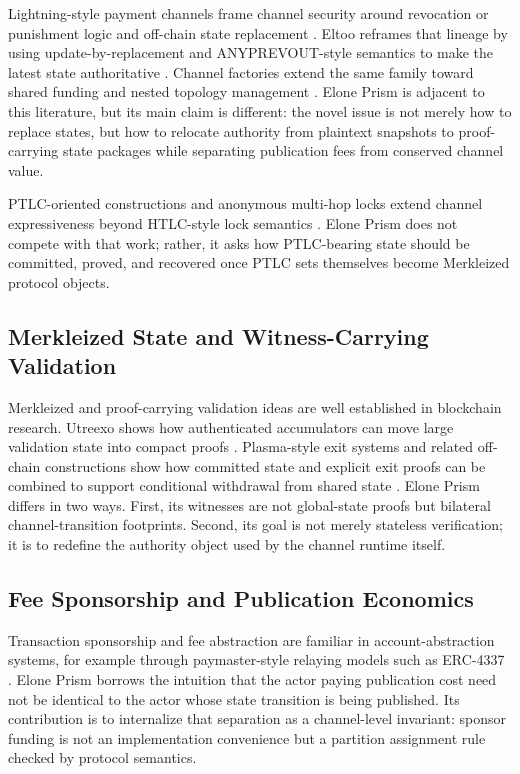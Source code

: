 \documentclass[11pt,a4paper]{article}
\newcommand{\rfc}[1]{\textsc{#1}}
\begin{document}
Lightning-style payment channels frame channel security around revocation or punishment logic and off-chain state replacement \cite{poondryja2016lightning}. Eltoo reframes that lineage by using update-by-replacement and \rfc{ANYPREVOUT}-style semantics to make the latest state authoritative \cite{decker2018eltoo,bip118}. Channel factories extend the same family toward shared funding and nested topology management \cite{burchert2018factories}. Elone Prism is adjacent to this literature, but its main claim is different: the novel issue is not merely how to replace states, but how to relocate authority from plaintext snapshots to proof-carrying state packages while separating publication fees from conserved channel value.

PTLC-oriented constructions and anonymous multi-hop locks extend channel expressiveness beyond HTLC-style lock semantics \cite{malavolta2019amhl}. Elone Prism does not compete with that work; rather, it asks how PTLC-bearing state should be committed, proved, and recovered once PTLC sets themselves become Merkleized protocol objects.

\subsection{Merkleized State and Witness-Carrying Validation}

Merkleized and proof-carrying validation ideas are well established in blockchain research. Utreexo shows how authenticated accumulators can move large validation state into compact proofs \cite{dryja2019utreexo}. Plasma-style exit systems and related off-chain constructions show how committed state and explicit exit proofs can be combined to support conditional withdrawal from shared state \cite{poon2017plasma}. Elone Prism differs in two ways. First, its witnesses are not global-state proofs but bilateral channel-transition footprints. Second, its goal is not merely stateless verification; it is to redefine the authority object used by the channel runtime itself.

\subsection{Fee Sponsorship and Publication Economics}

Transaction sponsorship and fee abstraction are familiar in account-abstraction systems, for example through paymaster-style relaying models such as ERC-4337 \cite{erc4337}. Elone Prism borrows the intuition that the actor paying publication cost need not be identical to the actor whose state transition is being published. Its contribution is to internalize that separation as a channel-level invariant: sponsor funding is not an implementation convenience but a partition assignment rule checked by protocol semantics.
\end{document}
